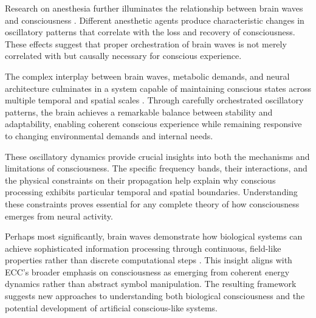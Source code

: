 Research on anesthesia further illuminates the relationship between brain waves and consciousness \cite{Kahana2001}. Different anesthetic agents produce characteristic changes in oscillatory patterns that correlate with the loss and recovery of consciousness. These effects suggest that proper orchestration of brain waves is not merely correlated with but causally necessary for conscious experience.

The complex interplay between brain waves, metabolic demands, and neural architecture culminates in a system capable of maintaining conscious states across multiple temporal and spatial scales \cite{Varela2001}. Through carefully orchestrated oscillatory patterns, the brain achieves a remarkable balance between stability and adaptability, enabling coherent conscious experience while remaining responsive to changing environmental demands and internal needs.

These oscillatory dynamics provide crucial insights into both the mechanisms and limitations of consciousness. The specific frequency bands, their interactions, and the physical constraints on their propagation help explain why conscious processing exhibits particular temporal and spatial boundaries. Understanding these constraints proves essential for any complete theory of how consciousness emerges from neural activity.

Perhaps most significantly, brain waves demonstrate how biological systems can achieve sophisticated information processing through continuous, field-like properties rather than discrete computational steps \cite{Singer2018}. This insight aligns with ECC's broader emphasis on consciousness as emerging from coherent energy dynamics rather than abstract symbol manipulation. The resulting framework suggests new approaches to understanding both biological consciousness and the potential development of artificial conscious-like systems.